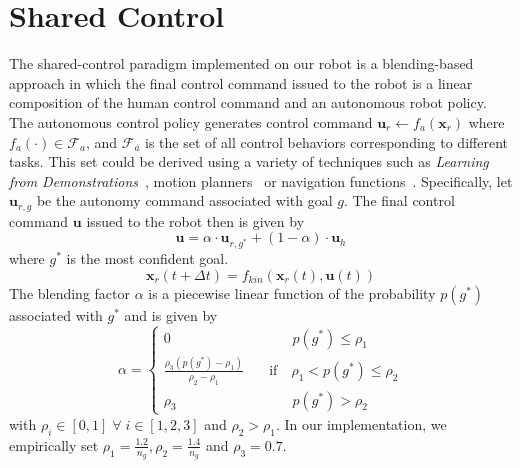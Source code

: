\documentclass[natbib, twocolumn]{svjour3}          %
\begin{document}
\section{Shared Control}\label{sec:shared-control}
The shared-control paradigm implemented on our robot is a blending-based approach in  which the final control command issued to the robot is a linear composition of the human control command and an autonomous robot policy.
The autonomous control policy generates control command
$\boldsymbol{u}_r \leftarrow f_{a}(\boldsymbol{x}_r)$
where $f_{a}(\cdot) \in \mathcal{F}_{a}$, and $\mathcal{F}_{a}$ is the set of all control behaviors corresponding to different tasks. This set could be derived using a variety of techniques such as \textit{Learning from Demonstrations}~\citep{argall2009survey, schaal1997learning}, motion planners~\citep{hsu2002randomized,ratliff2009chomp} or navigation functions~\citep{rimon1992exact,tanner2003nonholonomic}. Specifically, let $\boldsymbol{u}_{r,g}$ be the autonomy command associated with goal $g$. The final control command $\boldsymbol{u}$ issued to the robot then is given by
\begin{equation*}
\boldsymbol{u} = \alpha\cdot \boldsymbol{u}_{r,g^*} + (1 - \alpha)\cdot \boldsymbol{u}_h
\end{equation*}
where $g^*$ is the most confident goal. 
\begin{equation*}
\boldsymbol{x}_r(t+\Delta t) = f_{kin}(\boldsymbol{x}_r(t), \boldsymbol{u}(t))
\end{equation*}
  The blending factor $\alpha$ is a piecewise linear function of the probability $p(g^*)$ associated with $g^*$ and is given by
$$
\alpha = \left\{
\begin{array}{ll}
0 & \quad\quad~~~ p(g^*) \leq \rho_1 \\
\frac{\rho_3 (p(g^*) - \rho_1)}{\rho_2 - \rho_1}  &  \quad \text{if}\quad \rho_1 < p(g^*) \leq \rho_2  \\
\rho_3 & \quad\quad~~~ p(g^*) > \rho_2 	
\end{array}
\right.
$$
with $\rho_i \in [0, 1] \;\forall\; i \in [1,2,3]$ and $ \rho_2 > \rho_1$. 
In our implementation, we empirically set $\rho_1 = \frac{1.2}{n_g}, \rho_2 = \frac{1.4}{n_g}$ and $ \rho_3 = 0.7$.
\end{document}
